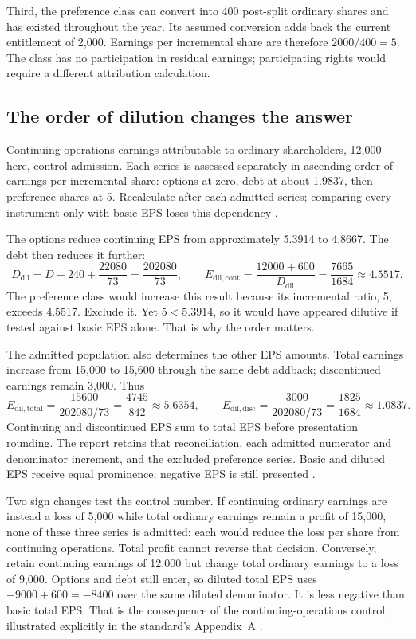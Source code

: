 Third, the preference class can convert into 400 post-split ordinary
shares and has existed throughout the year. Its assumed conversion adds
back the current entitlement of 2,000. Earnings per incremental share
are therefore $2000/400=5$. The class has no participation in residual
earnings; participating rights would require a different attribution
calculation.

\subsection{The order of dilution changes the answer}

Continuing-operations earnings attributable to ordinary shareholders,
12,000 here, control admission. Each series is assessed separately in
ascending order of earnings per incremental share: options at zero,
debt at about 1.9837, then preference shares at 5. Recalculate after each
admitted series; comparing every instrument only with basic EPS loses
this dependency \citep[IAS~33, paragraphs 41--44]{eu20231803}.

The options reduce continuing EPS from approximately 5.3914 to 4.8667.
The debt then reduces it further:
\[
 D_{\mathrm{dil}}=D+240+\frac{22080}{73}
                 =\frac{202080}{73},
 \qquad
 E_{\mathrm{dil,cont}}
   =\frac{12000+600}{D_{\mathrm{dil}}}
   =\frac{7665}{1684}\approx4.5517.
\]
The preference class would increase this result because its incremental
ratio, 5, exceeds 4.5517. Exclude it. Yet $5<5.3914$, so it would have
appeared dilutive if tested against basic EPS alone. That is why the
order matters.

The admitted population also determines the other EPS amounts. Total
earnings increase from 15,000 to 15,600 through the same debt addback;
discontinued earnings remain 3,000. Thus
\[
 E_{\mathrm{dil,total}}=\frac{15600}{202080/73}
       =\frac{4745}{842}\approx5.6354,\qquad
 E_{\mathrm{dil,disc}}=\frac{3000}{202080/73}
       =\frac{1825}{1684}\approx1.0837.
\]
Continuing and discontinued EPS sum to total EPS before presentation
rounding. The report retains that reconciliation, each admitted numerator
and denominator increment, and the excluded preference series. Basic and
diluted EPS receive equal prominence; negative EPS is still presented
\citep[IAS~33, paragraphs 66--70]{eu20231803}.

Two sign changes test the control number. If continuing ordinary earnings
are instead a loss of 5,000 while total ordinary earnings remain a profit
of 15,000, none of these three series is admitted: each would reduce the
loss per share from continuing operations. Total profit cannot reverse
that decision. Conversely, retain continuing earnings of 12,000 but
change total ordinary earnings to a loss of 9,000. Options and debt still
enter, so diluted total EPS uses $-9000+600=-8400$ over the same diluted
denominator. It is less negative than basic total EPS. That is the
consequence of the continuing-operations control, illustrated explicitly
in the standard's Appendix~A
\citep[IAS~33, paragraphs 41--43 and A3]{eu20231803}.

